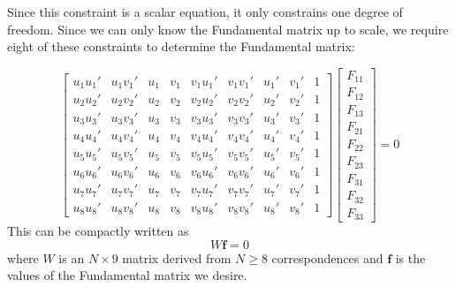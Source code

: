 \documentclass[a4paper, 12pt]{article}
\begin{document}
Since this constraint is a scalar equation, it only constrains one degree of freedom. Since we can only know the Fundamental matrix up to scale, we require eight of these constraints to determine the Fundamental matrix:

\begin{equation}
    \begin{bmatrix}
    u_1u_1' & u_1v_1' & u_1 & v_1 & v_1u_1' & v_1v_1' & u_1' & v_1' & 1 \\ 
    u_2u_2' & u_2v_2' & u_2 & v_2 & v_2u_2' & v_2v_2' & u_2' & v_2' & 1 \\
    u_3u_3' & u_3v_3' & u_3 & v_3 & v_3u_3' & v_3v_3' & u_3' & v_3' & 1 \\
    u_4u_4' & u_4v_4' & u_4 & v_4 & v_4u_4' & v_4v_4' & u_4' & v_4' & 1\\
    u_5u_5' & u_5v_5' & u_5 & v_5 & v_5u_5' & v_5v_5' & u_5' & v_5' & 1\\
    u_6u_6' & u_6v_6' & u_6 & v_6 & v_6u_6' & v_6v_6' & u_6' & v_6' & 1 \\
    u_7u_7' & u_7v_7' & u_7 & v_7 & v_7u_7' & v_7v_7' & u_7' & v_7' & 1 \\
    u_8u_8' & u_8v_8' & u_8 & v_8 & v_8u_8' & v_8v_8' & u_8' & v_8' & 1
    \end{bmatrix}
    \begin{bmatrix}F_{11}\\F_{12}\\F_{13}\\F_{21}\\F_{22}\\F_{23}\\F_{31}\\F_{32}\\F_{33}\end{bmatrix} = 0
\end{equation}
This can be compactly written as 
\begin{equation}
    W\mathbf{f} = 0
    \label{eq:compact_8}
\end{equation}
where $W$ is an $N\times 9$ matrix derived from $N \geq 8$ correspondences and $\mathbf{f}$ is the values of the Fundamental matrix we desire. 
\end{document}
